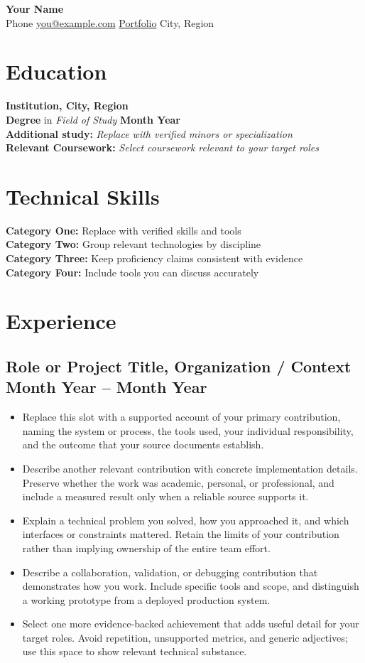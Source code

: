 \documentclass[letterpaper,10pt]{article}
\begin{document}
\begin{center}
    {\LARGE \textbf{Your Name}} \\
    \vspace{1em}
    Phone \textbullet{} \href{mailto:you@example.com}{you@example.com} \textbullet{}
    \href{https://example.com}{Portfolio} \textbullet{} City, Region
\end{center}
\section*{Education}
\textbf{Institution, City, Region} \\
\textbf{Degree} in \textit{Field of Study} \hfill \textbf{Month Year}\\
\textbf{Additional study:} \textit{Replace with verified minors or specialization} \\
\textbf{Relevant Coursework:} \textit{Select coursework relevant to your target roles}
\section*{Technical Skills}
\textbf{Category One:} Replace with verified skills and tools \\
\textbf{Category Two:} Group relevant technologies by discipline \\
\textbf{Category Three:} Keep proficiency claims consistent with evidence \\
\textbf{Category Four:} Include tools you can discuss accurately
\section*{Experience}
\subsection*{Role or Project Title, Organization / Context \hfill Month Year -- Month Year}
\begin{itemize}
\item Replace this slot with a supported account of your primary contribution, naming the system or process, the tools used, your individual responsibility, and the outcome that your source documents establish.
\item Describe another relevant contribution with concrete implementation details. Preserve whether the work was academic, personal, or professional, and include a measured result only when a reliable source supports it.
\item Explain a technical problem you solved, how you approached it, and which interfaces or constraints mattered. Retain the limits of your contribution rather than implying ownership of the entire team effort.
\item Describe a collaboration, validation, or debugging contribution that demonstrates how you work. Include specific tools and scope, and distinguish a working prototype from a deployed production system.
\item Select one more evidence-backed achievement that adds useful detail for your target roles. Avoid repetition, unsupported metrics, and generic adjectives; use this space to show relevant technical substance.
\end{itemize}
\end{document}
